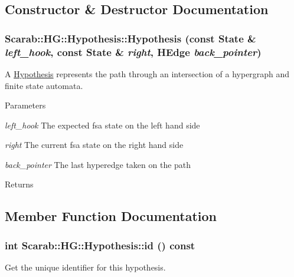 \subsection{Constructor \& Destructor Documentation}
\hypertarget{structScarab_1_1HG_1_1Hypothesis_aca7357ce485cb960fadb2cc62f1a888a}{
\subsubsection[{Hypothesis}]{\setlength{\rightskip}{0pt plus 5cm}Scarab::HG::Hypothesis::Hypothesis (const {\bf State} \& {\em left\_\-hook}, \/  const {\bf State} \& {\em right}, \/  {\bf HEdge} {\em back\_\-pointer})}}
\label{structScarab_1_1HG_1_1Hypothesis_aca7357ce485cb960fadb2cc62f1a888a}
A \hyperlink{structScarab_1_1HG_1_1Hypothesis}{Hypothesis} represents the path through an intersection of a hypergraph and finite state automata.


\begin{DoxyParams}{Parameters}
\item[{\em left\_\-hook}]The expected fsa state on the left hand side \item[{\em right}]The current fsa state on the right hand side \item[{\em back\_\-pointer}]The last hyperedge taken on the path\end{DoxyParams}
\begin{DoxyReturn}{Returns}

\end{DoxyReturn}


\subsection{Member Function Documentation}
\hypertarget{structScarab_1_1HG_1_1Hypothesis_a5a69f417c889d4d96ad5a78aa1dd2f7d}{
\subsubsection[{id}]{\setlength{\rightskip}{0pt plus 5cm}int Scarab::HG::Hypothesis::id () const}}
\label{structScarab_1_1HG_1_1Hypothesis_a5a69f417c889d4d96ad5a78aa1dd2f7d}
Get the unique identifier for this hypothesis.

